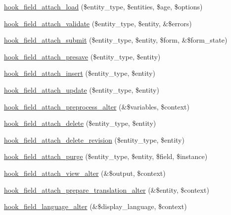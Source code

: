 \label{_amgrpd41d8cd98f00b204e9800998ecf8427e}
 \begin{DoxyCompactItemize}
\item 
\hyperlink{group__field__attach_gaf684402532a3eaebecc456c751142903}{hook\_\-field\_\-attach\_\-load} (\$entity\_\-type, \$entities, \$age, \$options)
\item 
\hyperlink{group__field__attach_ga59269788b50bdcc28d42ad25907db1a5}{hook\_\-field\_\-attach\_\-validate} (\$entity\_\-type, \$entity, \&\$errors)
\item 
\hyperlink{group__field__attach_ga368ea58ca800b1e1f69f4b88e82f9ae0}{hook\_\-field\_\-attach\_\-submit} (\$entity\_\-type, \$entity, \$form, \&\$form\_\-state)
\item 
\hyperlink{group__field__attach_gab245c28e50df239cde3a566806ee74db}{hook\_\-field\_\-attach\_\-presave} (\$entity\_\-type, \$entity)
\item 
\hyperlink{group__field__attach_ga1a964f8aff654dca906c8784ba367115}{hook\_\-field\_\-attach\_\-insert} (\$entity\_\-type, \$entity)
\item 
\hyperlink{group__field__attach_gab8036ab794b9c28993e2414b7829caf1}{hook\_\-field\_\-attach\_\-update} (\$entity\_\-type, \$entity)
\item 
\hyperlink{group__field__attach_ga0d592a702a05792a8549ae777db00792}{hook\_\-field\_\-attach\_\-preprocess\_\-alter} (\&\$variables, \$context)
\item 
\hyperlink{group__field__attach_gac9e5a9e43f1290315db8b593b9516094}{hook\_\-field\_\-attach\_\-delete} (\$entity\_\-type, \$entity)
\item 
\hyperlink{group__field__attach_ga99f52991e1d235aa3c57d21778b4b595}{hook\_\-field\_\-attach\_\-delete\_\-revision} (\$entity\_\-type, \$entity)
\item 
\hyperlink{group__field__attach_ga096a9ba58b47bf4c2aa7e0f80e136ced}{hook\_\-field\_\-attach\_\-purge} (\$entity\_\-type, \$entity, \$field, \$instance)
\item 
\hyperlink{group__field__attach_ga0c415aacfd70903f556fb67517dfe1ee}{hook\_\-field\_\-attach\_\-view\_\-alter} (\&\$output, \$context)
\item 
\hyperlink{group__field__attach_ga497cd230a4a6bf6318784f6cf08e3758}{hook\_\-field\_\-attach\_\-prepare\_\-translation\_\-alter} (\&\$entity, \$context)
\item 
\hyperlink{group__field__attach_ga6411d5b5a528850a6e53c87ff899cabc}{hook\_\-field\_\-language\_\-alter} (\&\$display\_\-language, \$context)
\item 

\end{DoxyCompactItemize}

